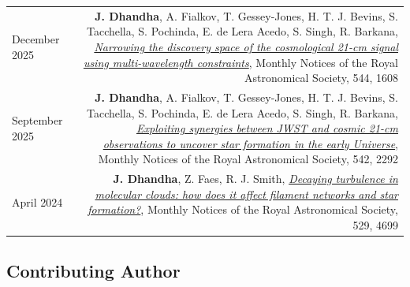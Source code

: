 \documentclass{article}
\begin{document}
\begin{longtable}{L!{\vrule}R}
    December 2025 & \textbf{J. Dhandha}, A. Fialkov, T. Gessey-Jones, H. T. J. Bevins, S. Tacchella, S. Pochinda, E. de Lera Acedo, S. Singh, R. Barkana, \href{https://ui.adsabs.harvard.edu/abs/2025MNRAS.544.1608D}{\textit{Narrowing the discovery space of the cosmological 21-cm signal using multi-wavelength constraints}}, Monthly Notices of the Royal Astronomical Society, 544, 1608 \\

    September 2025 & \textbf{J. Dhandha}, A. Fialkov, T. Gessey-Jones, H. T. J. Bevins, S. Tacchella, S. Pochinda, E. de Lera Acedo, S. Singh, R. Barkana, \href{https://ui.adsabs.harvard.edu/abs/2025MNRAS.542.2292D}{\textit{Exploiting synergies between JWST and cosmic 21-cm observations to uncover star formation in the early Universe}}, Monthly Notices of the Royal Astronomical Society, 542, 2292 \\

    April 2024 & \textbf{J. Dhandha}, Z. Faes, R. J. Smith, \href{https://ui.adsabs.harvard.edu/abs/2024MNRAS.529.4699D}{\textit{Decaying turbulence in molecular clouds: how does it affect filament networks and star formation?}}, Monthly Notices of the Royal Astronomical Society, 529, 4699 \\
\end{longtable}

\subsection*{Contributing Author}
\end{document}
